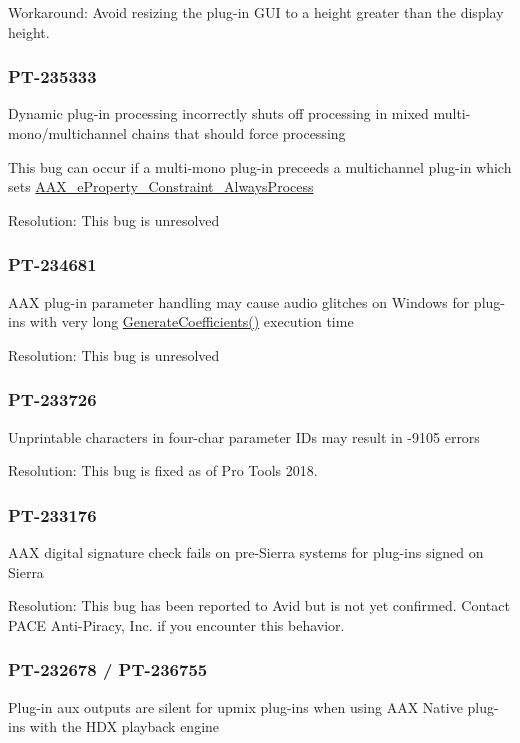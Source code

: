 Workaround\+: Avoid resizing the plug-\/in G\+UI to a height greater than the display height.\hypertarget{a00846_PT-235333}{}\subsubsection{P\+T-\/235333}\label{a00846_PT-235333}
Dynamic plug-\/in processing incorrectly shuts off processing in mixed multi-\/mono/multichannel chains that should force processing

This bug can occur if a multi-\/mono plug-\/in preceeds a multichannel plug-\/in which sets \mbox{\hyperlink{a00662_a13e384f22825afd3db6d68395b79ce0da510e79713c2f14ebb0a50ed2ab0ff679}{A\+A\+X\+\_\+e\+Property\+\_\+\+Constraint\+\_\+\+Always\+Process}}

Resolution\+: This bug is unresolved\hypertarget{a00846_PT-234681}{}\subsubsection{P\+T-\/234681}\label{a00846_PT-234681}
A\+AX plug-\/in parameter handling may cause audio glitches on Windows for plug-\/ins with very long \mbox{\hyperlink{a01669_a083265b008921b6114ede387711694b7}{Generate\+Coefficients()}} execution time

Resolution\+: This bug is unresolved\hypertarget{a00846_PT-233726}{}\subsubsection{P\+T-\/233726}\label{a00846_PT-233726}
Unprintable characters in four-\/char parameter I\+Ds may result in -\/9105 errors

Resolution\+: This bug is fixed as of Pro Tools 2018.\hypertarget{a00846_PT-233176}{}\subsubsection{P\+T-\/233176}\label{a00846_PT-233176}
A\+AX digital signature check fails on pre-\/\+Sierra systems for plug-\/ins signed on Sierra

Resolution\+: This bug has been reported to Avid but is not yet confirmed. Contact P\+A\+CE Anti-\/\+Piracy, Inc. if you encounter this behavior.\hypertarget{a00846_PT-232678}{}\subsubsection{P\+T-\/232678 / P\+T-\/236755}\label{a00846_PT-232678}
Plug-\/in aux outputs are silent for upmix plug-\/ins when using A\+AX Native plug-\/ins with the H\+DX playback engine

